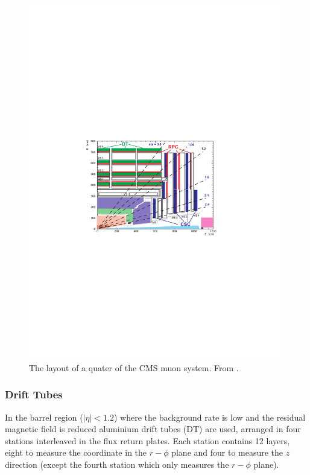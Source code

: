 \begin{figure}[htbp]
  \centering
  \includegraphics[width=0.98\textwidth]{muon_system}
  \caption{The layout of a quater of the \acs{CMS} muon system. From \cite{tdr}.}
  \label{fig:muon_system}
\end{figure}

\subsubsection{Drift Tubes}
In the barrel region ($|\eta| < 1.2$)
where the background rate is low and the residual magnetic field is reduced
 aluminium drift tubes (DT) are used,
arranged in four stations interleaved in the flux return
plates. 
Each station contains 12 layers, eight to measure the coordinate in the
$r-\phi$ plane and four to measure the $z$ direction (except the fourth station
which only measures the $r-\phi$ plane). 

